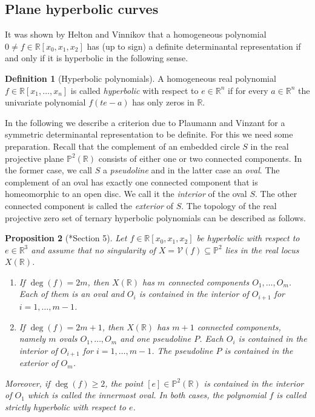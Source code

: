 \documentclass[a4paper,10pt]{amsart}
\theoremstyle{definition}
\newtheorem{Def}{Definition}[section]
\theoremstyle{plain}
\newtheorem{prop}[Def]{Proposition}
\newcommand{\cV}{{\mathcal V}}
\newcommand{\R}{{\mathbb R}}
\newcommand{\pp}{\mathbb{P}}
\begin{document}
\subsection{Plane hyperbolic curves}
It was shown by Helton and Vinnikov \cite{heltonvinnikov} that a homogeneous polynomial $0\neq f\in\R[x_0,x_1,x_2]$ has (up to sign) a definite determinantal representation if and only if it is hyperbolic in the following sense.
\begin{Def}[Hyperbolic polynomials]
 A homogeneous real polynomial $f\in\R[x_1,\ldots,x_n]$ is called \emph{hyperbolic} with respect to $e\in\R^n$ if for every $a\in\R^n$ the univariate polynomial $f(te-a)$ has only zeros in $\R$.
\end{Def}
In the following we describe a criterion due to Plaumann and Vinzant \cite{PlaumannVinzantHyp2013LDR} for a symmetric determinantal representation to be definite. For this we need some preparation.
Recall that the complement of an embedded circle $S$ in the real projective plane $\pp^2(\R)$ consists of either one or two connected components. In the former case, we call $S$ a \emph{pseudoline} and in the latter case an \emph{oval}. The complement of an oval has exactly one connected component that is homeomorphic to an open disc. We call it the \emph{interior} of the oval $S$. The other connected component is called the \emph{exterior} of $S$. The topology of the real projective zero set of ternary hyperbolic polynomials can be described as follows.
\begin{prop}[\cite{heltonvinnikov}*{Section 5}] \label{prop:hyperbRealLocus}
 Let $f\in\R[x_0,x_1,x_2]$ be hyperbolic with respect to $e\in\R^3$ and assume that no singularity of $X=\cV(f)\subseteq\pp^2$ lies in the real locus $X(\R)$.
 \begin{enumerate}
  \item If $\deg(f)=2m$, then $X(\R)$ has $m$ connected components $O_1,\ldots,O_m$. Each of them is an oval and $O_i$ is contained in the interior of $O_{i+1}$ for $i=1,\ldots,m-1$.
  \item If $\deg(f)=2m+1$, then $X(\R)$ has $m+1$ connected components, namely $m$ ovals $O_1,\ldots,O_m$ and one pseudoline $P$. Each $O_i$ is contained in the interior of $O_{i+1}$ for $i=1,\ldots,m-1$. The pseudoline $P$ is contained in the exterior of $O_m$.
 \end{enumerate}
 Moreover, if $\deg(f)\geq2$, the point $[e]\in\pp^2(\R)$ is contained in the interior of $O_1$ which is called the \emph{innermost oval}.
 In both cases,  the polynomial $f$ is called \emph{strictly hyperbolic} with respect to $e$.
\end{prop}
\end{document}
